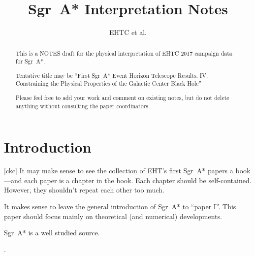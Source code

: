 \documentclass[twocolumn,tighten]{aastex63}
\newcommand\sgra{Sgr~A*\xspace}
\newcommand\<{{\langle}}
\renewcommand\>{{\rangle}} %
\newcommand\ckc[1]{{\color{blue}[ckc] #1}}
\begin{document}
\title{\sgra Interpretation Notes}
\author{EHTC et al.}

\shorttitle{\sgra Interpretation}

\revised{\today}

\begin{abstract}
    This is a NOTES draft for the physical interpretation of EHTC 2017 campaign data for \sgra.

    Tentative title may be ``First \sgra Event Horizon Telescope Results. IV. Constraining the Physical Properties of the Galactic Center Black Hole''

    Please feel free to add your work and comment on existing notes, but do not delete anything without consulting the paper coordinators.
\end{abstract}


\section{Introduction} \label{sec:intro}

\ckc{It may make sense to see the collection of EHT's first \sgra papers a book---and each paper is a chapter in the book.  Each chapter should be self-contained.  However, they shouldn't repeat each other too much.

It makes sense to leave the general introduction of \sgra to ``paper I''.  This paper should focus mainly on theoretical (and numerical) developments.}

\sgra is a well studied source.

\citep{
  1998ApJ...492..554N,
  1999ApJ...522..870M,
  2000ApJ...541..234O,
  2003ANS...324..445M,
  2006MNRAS.370..219M,
  2007MNRAS.379.1519M,
  2009A&A...508L..13M,
  2009ApJ...698..676D,
  2009ApJ...701..521C,
  2009ApJ...706..497M,
  2012MNRAS.421.1315Z,
  2013A&A...559L...3M,
  2014A&A...570A...7M,
  2014ApJ...790....1B,
  2015A&A...576A..41B,
  2015ApJ...799....1C,
  2015ApJ...802...69B,
  2015ApJ...812..103C,
  2015ApJ...814..115P,
  2015Sci...350.1242J,
  2016A&A...588A..57F,
  2016ApJ...817..173L,
  2016ApJ...818..121P,
  2016ApJ...824...40O,
  2016ApJ...826...77B,
  2016ApJ...831....4P,
  2016MNRAS.455.2187M,
  2016PhRvL.116c1101J,
  2017ApJ...837..180G,
  2017ApJ...844...35M,
  2017ApJ...851..148M,
  2017MNRAS.467.3604R,
  2018A&A...612A..34D,
  2018ApJ...856..163M,
  2018ApJ...859...60L,
  2018ApJ...863..148P,
  2018ApJ...865..104J,
  2018ApJ...868..101B,
  2018JCAP...07..015H,
  2018MNRAS.478.1875J,
  2018MNRAS.478.5209C,
  2019ApJ...871...30I,
  2019ApJ...881L...2B,
  2019ApJ...884..148B,
  2019ApJ...886...96H,
  2019GReGr..51..137P,
  2020ApJ...896L...6R,
  2020ApJ...897...99T,
  2020MNRAS.492.3272R,
  2020MNRAS.493.1404A,
  2020MNRAS.494.4168D,
  2020MNRAS.494.5923P,
  2020arXiv200514251B,
  2020arXiv200603657D,
  2020arXiv200603658P
}.
\end{document}
